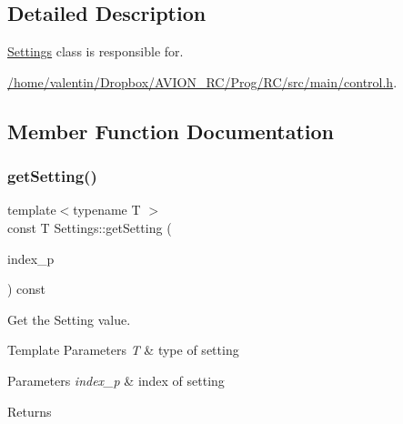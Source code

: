 \subsection{Detailed Description}
\hyperlink{class_settings}{Settings} class is responsible for. \begin{Desc}
\item[Examples\+: ]\par
\hyperlink{_2home_2valentin_2_dropbox_2_a_v_i_o_n__r_c_2_prog_2_r_c_2src_2main_2control_8h-example}{/home/valentin/\+Dropbox/\+A\+V\+I\+O\+N\+\_\+\+R\+C/\+Prog/\+R\+C/src/main/control.\+h}.\end{Desc}


\subsection{Member Function Documentation}
\mbox{\label{class_settings_a61df1edd21940600c4c6647adb177a91}} 
\subsubsection{\texorpdfstring{get\+Setting()}{getSetting()}}
{\footnotesize\ttfamily template$<$typename T $>$ \\
const T Settings\+::get\+Setting (\begin{DoxyParamCaption}\item[{uint8\+\_\+t}]{index\+\_\+p }\end{DoxyParamCaption}) const\hspace{0.3cm}{\ttfamily [inline]}}



Get the Setting value. 


\begin{DoxyTemplParams}{Template Parameters}
{\em T} & type of setting \\
\hline
\end{DoxyTemplParams}

\begin{DoxyParams}{Parameters}
{\em index\+\_\+p} & index of setting \\
\hline
\end{DoxyParams}
\begin{DoxyReturn}{Returns}

\end{DoxyReturn}
\mbox{\label{class_settings_a49f0ce2f4dbff5b59f4b8658a06b49bb}} 
